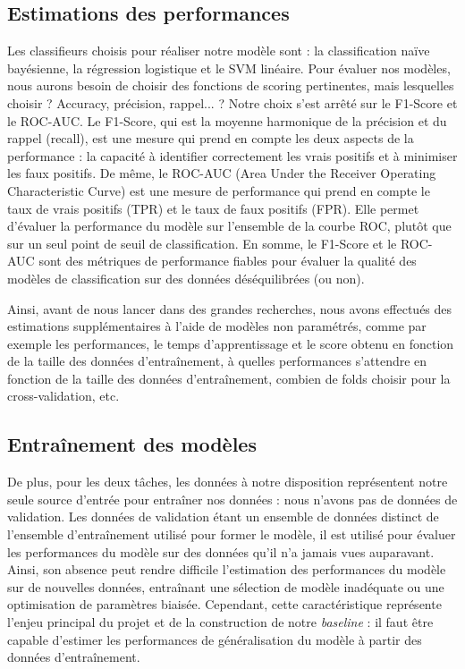 \documentclass{article}
\begin{document}
\subsection{Estimations des performances}

Les classifieurs choisis pour réaliser notre modèle sont : la classification naïve bayésienne, la régression logistique et le SVM linéaire. Pour évaluer nos modèles, nous aurons besoin de choisir des fonctions de scoring pertinentes, mais lesquelles choisir ? Accuracy, précision, rappel... ? Notre choix s'est arrêté sur le F1-Score et le ROC-AUC. Le F1-Score, qui est la moyenne harmonique de la précision et du rappel (recall), est une mesure qui prend en compte les deux aspects de la performance : la capacité à identifier correctement les vrais positifs et à minimiser les faux positifs. De même, le ROC-AUC (Area Under the Receiver Operating Characteristic Curve) est une mesure de performance qui prend en compte le taux de vrais positifs (TPR) et le taux de faux positifs (FPR). Elle permet d'évaluer la performance du modèle sur l'ensemble de la courbe ROC, plutôt que sur un seul point de seuil de classification. En somme, le F1-Score et le ROC-AUC sont des métriques de performance fiables pour évaluer la qualité des modèles de classification sur des données déséquilibrées (ou non). 

Ainsi, avant de nous lancer dans des grandes recherches, nous avons effectués des estimations supplémentaires à l'aide de modèles non paramétrés, comme par exemple les performances, le temps d'apprentissage et le score obtenu en fonction de la taille des données d'entraînement, à quelles performances s'attendre en fonction de la taille des données d'entraînement, combien de folds choisir pour la cross-validation, etc.

\subsection{Entraînement des modèles}

De plus, pour les deux tâches, les données à notre disposition représentent notre seule source d'entrée pour entraîner nos données : nous n'avons pas de données de validation. Les données de validation étant un ensemble de données distinct de l'ensemble d'entraînement utilisé pour former le modèle, il est utilisé pour évaluer les performances du modèle sur des données qu'il n'a jamais vues auparavant. Ainsi, son absence peut rendre difficile l'estimation des performances du modèle sur de nouvelles données, entraînant une sélection de modèle inadéquate ou une optimisation de paramètres biaisée. Cependant, cette caractéristique représente l'enjeu principal du projet et de la construction de notre \textit{baseline} : il faut être capable d'estimer les performances de généralisation du modèle à partir des données d'entraînement.
\end{document}
